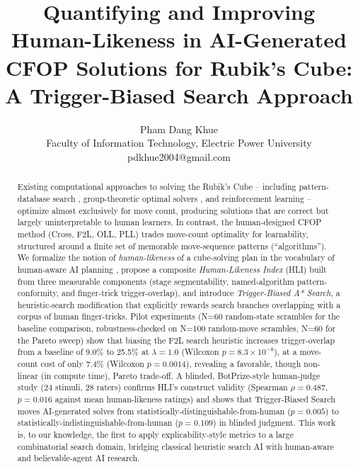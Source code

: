 \documentclass[10pt,conference]{article}
\title{Quantifying and Improving Human-Likeness in AI-Generated CFOP
Solutions for Rubik's Cube: A Trigger-Biased Search Approach}
\author{
  Pham Dang Khue \\
  Faculty of Information Technology, Electric Power University\\
  pdkhue2004@gmail.com
}
\date{}
\begin{document}
\maketitle

\begin{abstract}
Existing computational approaches to solving the Rubik's Cube --
including pattern-database search \citep{korf1997}, group-theoretic
optimal solvers \citep{rokicki2014,kociemba}, and reinforcement
learning \citep{mcaleer2018} -- optimize almost exclusively for move
count, producing solutions that are correct but largely
uninterpretable to human learners. In contrast, the human-designed
CFOP method (Cross, F2L, OLL, PLL) trades move-count optimality for
learnability, structured around a finite set of memorable
move-sequence patterns (``algorithms''). We formalize the notion of
\emph{human-likeness} of a cube-solving plan in the vocabulary of
human-aware AI planning \citep{kulkarni2016,chakraborti2019},
propose a composite \emph{Human-Likeness Index} (HLI) built from
three measurable components (stage segmentability, named-algorithm
pattern-conformity, and finger-trick trigger-overlap), and introduce
\emph{Trigger-Biased A* Search}, a heuristic-search modification that
explicitly rewards search branches overlapping with a corpus of
human finger-tricks. Pilot experiments (N=60 random-state scrambles
for the baseline comparison, robustness-checked on N=100 random-move
scrambles, N=60 for the Pareto sweep) show that biasing the F2L
search heuristic increases
trigger-overlap from a baseline of 9.0\% to 25.5\% at $\lambda=1.0$
(Wilcoxon $p=8.3\times10^{-8}$), at a move-count cost of only 7.4\%
(Wilcoxon $p=0.0014$), revealing a favorable, though non-linear (in
compute time), Pareto trade-off. A blinded, BotPrize-style
\citep{hingston2009} human-judge study (24 stimuli, 28 raters)
confirms HLI's construct validity (Spearman $\rho=0.487$,
$p=0.016$ against mean human-likeness ratings) and shows that
Trigger-Biased Search moves AI-generated solves from
statistically-distinguishable-from-human ($p=0.005$) to
statistically-indistinguishable-from-human ($p=0.109$) in blinded
judgment. This work is, to our knowledge, the first
to apply explicability-style metrics to a large combinatorial search
domain, bridging classical heuristic search AI with human-aware and
believable-agent AI research.
\end{abstract}

\end{document}
